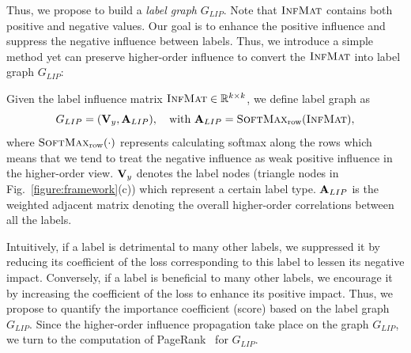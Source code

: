 Thus, we propose to build a \textit{label graph} $G_{LIP}$. 
Note that $\textsc{InfMat}$ contains both positive and negative values. Our goal is to enhance the positive influence and suppress the negative influence between labels.
Thus, we introduce a simple method yet can preserve higher-order influence to convert the $\textsc{InfMat}$ into label graph $G_{LIP}$:
\begin{definition} \label{def:G_lip}
Given the label influence matrix $\textsc{InfMat} \in \mathbb{R}^{k \times k}$, we define label graph as
\begin{equation}
    G_{LIP}= (\mathbf{V}_y, \mathbf{A}_{LIP}), \quad \text{with} \ \mathbf{A}_{LIP} = \textsc{SoftMax}_\text{row}(\textsc{InfMat}),
\end{equation}
where $\textsc{SoftMax}_\text{row}(\cdot)$ represents calculating softmax along the rows which means that we tend to treat the negative influence as weak positive influence in the higher-order view.
$\mathbf{V}_y$ denotes the label nodes (triangle nodes in Fig.~\ref{figure:framework}(c)) which represent a certain label type. $\mathbf{A}_{LIP}$ is the weighted adjacent matrix denoting the overall higher-order correlations between all the labels.
\end{definition}

 \label{sec:learn}
Intuitively, if a label is detrimental to many other labels, we suppressed it by reducing its coefficient of the loss corresponding to this label to lessen its negative impact. Conversely, if a label is beneficial to many other labels, we encourage it by increasing the coefficient of the loss to enhance its positive impact.
Thus, we propose to quantify the importance coefficient (score) based on the label graph $G_{LIP}$.
Since the higher-order influence propagation take place on the graph $G_{LIP}$, we turn to the computation of PageRank~\citep{Page1999ThePC} for $G_{LIP}$. 


